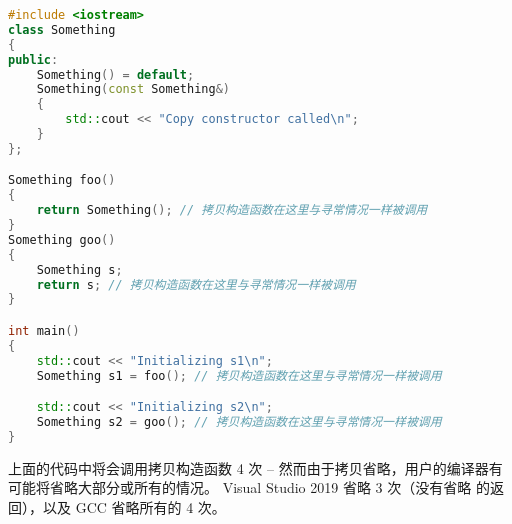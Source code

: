 \documentclass[../../LearnCpp.tex]{subfiles}
\begin{document}
\begin{lstlisting}[language=C++]
#include <iostream>
class Something
{
public:
	Something() = default;
	Something(const Something&)
	{
		std::cout << "Copy constructor called\n";
	}
};

Something foo()
{
	return Something(); // 拷贝构造函数在这里与寻常情况一样被调用
}
Something goo()
{
	Something s;
	return s; // 拷贝构造函数在这里与寻常情况一样被调用
}

int main()
{
	std::cout << "Initializing s1\n";
	Something s1 = foo(); // 拷贝构造函数在这里与寻常情况一样被调用

	std::cout << "Initializing s2\n";
	Something s2 = goo(); // 拷贝构造函数在这里与寻常情况一样被调用
}
\end{lstlisting}

上面的代码中将会调用拷贝构造函数 4 次 -- 然而由于拷贝省略，用户的编译器有可能将省略大部分或所有的情况。
Visual Studio 2019 省略 3 次（没有省略  的返回），以及 GCC 省略所有的 4 次。
\end{document}
